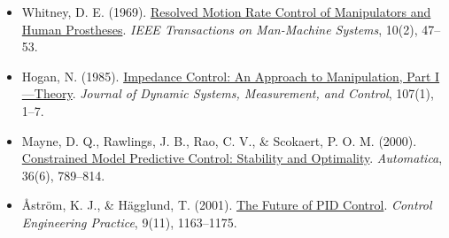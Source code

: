 \begin{itemize}
\item
  Whitney, D. E. (1969). \href{https://ieeexplore.ieee.org/document/4081862/}{Resolved Motion Rate Control of Manipulators and Human Prostheses}. \emph{IEEE Transactions on Man-Machine Systems}, 10(2), 47--53.
\item
  Hogan, N. (1985). \href{https://doi.org/10.1115/1.3140702}{Impedance Control: An Approach to Manipulation, Part I---Theory}. \emph{Journal of Dynamic Systems, Measurement, and Control}, 107(1), 1--7.
\item
  Mayne, D. Q., Rawlings, J. B., Rao, C. V., \& Scokaert, P. O. M. (2000). \href{https://www.sciencedirect.com/science/article/pii/S0005109899002149}{Constrained Model Predictive Control: Stability and Optimality}. \emph{Automatica}, 36(6), 789--814.
\item
  Åström, K. J., \& Hägglund, T. (2001). \href{https://www.sciencedirect.com/science/article/pii/S0967066101000624}{The Future of PID Control}. \emph{Control Engineering Practice}, 9(11), 1163--1175.
\end{itemize}

\clearpage
